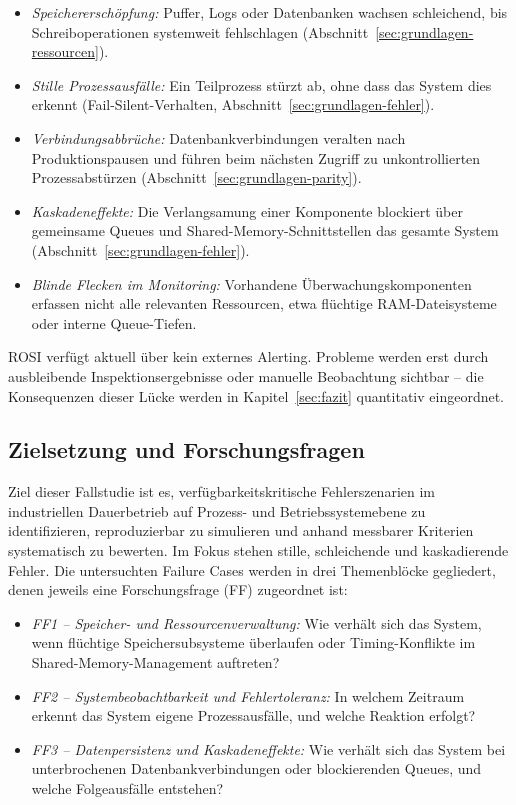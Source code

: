 \begin{itemize}
    \item \textit{Speichererschöpfung:} Puffer, Logs oder Datenbanken wachsen
          schleichend, bis Schreiboperationen systemweit fehlschlagen
          (Abschnitt~\ref{sec:grundlagen-ressourcen}).
    \item \textit{Stille Prozessausfälle:} Ein Teilprozess stürzt ab, ohne dass das
          System dies erkennt (Fail-Silent-Verhalten, Abschnitt~\ref{sec:grundlagen-fehler}).
    \item \textit{Verbindungsabbrüche:} Datenbankverbindungen veralten nach
          Produktionspausen und führen beim nächsten Zugriff zu unkontrollierten
          Prozessabstürzen (Abschnitt~\ref{sec:grundlagen-parity}).
    \item \textit{Kaskadeneffekte:} Die Verlangsamung einer Komponente blockiert über
          gemeinsame Queues und Shared-Memory-Schnittstellen das gesamte System
          (Abschnitt~\ref{sec:grundlagen-fehler}).
    \item \textit{Blinde Flecken im Monitoring:} Vorhandene Überwachungskomponenten
          erfassen nicht alle relevanten Ressourcen, etwa flüchtige RAM-Dateisysteme
          oder interne Queue-Tiefen.
\end{itemize}

ROSI verfügt aktuell über kein externes Alerting. Probleme werden erst durch
ausbleibende Inspektionsergebnisse oder manuelle Beobachtung sichtbar -- die
Konsequenzen dieser Lücke werden in Kapitel~\ref{sec:fazit} quantitativ eingeordnet.

\subsection{Zielsetzung und Forschungsfragen}
\label{sec:zielsetzung}

Ziel dieser Fallstudie ist es, verfügbarkeitskritische Fehlerszenarien im industriellen
Dauerbetrieb auf Prozess- und Betriebssystemebene zu identifizieren, reproduzierbar zu
simulieren und anhand messbarer Kriterien systematisch zu bewerten. Im Fokus stehen
stille, schleichende und kaskadierende Fehler. Die untersuchten Failure Cases werden in
drei Themenblöcke gegliedert, denen jeweils eine Forschungsfrage (FF) zugeordnet ist:

\begin{itemize}
    \item \textit{FF1 -- Speicher- und Ressourcenverwaltung:} Wie verhält sich das
          System, wenn flüchtige Speicher\-subsysteme überlaufen oder Timing-Konflikte
          im Shared-Memory-Management auftreten?
    \item \textit{FF2 -- Systembeobachtbarkeit und Fehlertoleranz:} In welchem Zeitraum
          erkennt das System eigene Prozessausfälle, und welche Reaktion erfolgt?
    \item \textit{FF3 -- Datenpersistenz und Kaskadeneffekte:} Wie verhält sich das
          System bei unterbrochenen Datenbankverbindungen oder blockierenden Queues,
          und welche Folgeausfälle entstehen?
\end{itemize}

